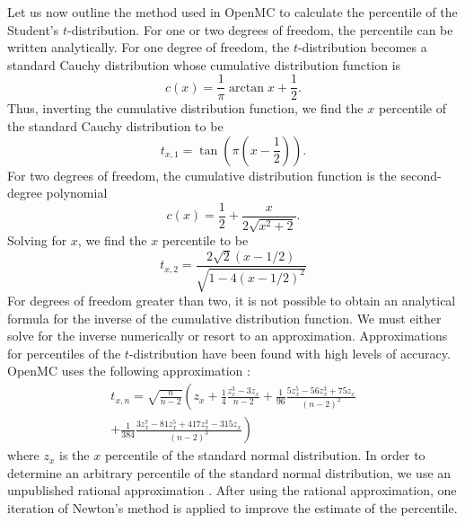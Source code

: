 Let us now outline the method used in OpenMC to calculate the percentile of the
Student's $t$-distribution. For one or two degrees of freedom, the percentile
can be written analytically. For one degree of freedom, the $t$-distribution
becomes a standard Cauchy distribution whose cumulative distribution function is
\begin{equation}
  \label{eq:cauchy-cdf}
  c(x) = \frac{1}{\pi} \arctan x + \frac{1}{2}. 
\end{equation}
Thus, inverting the cumulative distribution function, we find the $x$
percentile of the standard Cauchy distribution to be
\begin{equation}
  \label{eq:percentile-1}
  t_{x,1} = \tan \left ( \pi \left ( x - \frac{1}{2} \right ) \right ).
\end{equation}
For two degrees of freedom, the cumulative distribution function is the
second-degree polynomial
\begin{equation}
  \label{eq:t-2-polynomial}
  c(x) = \frac{1}{2} + \frac{x}{2\sqrt{x^2 + 2}}.
\end{equation}
Solving for $x$, we find the $x$ percentile to be
\begin{equation}
  \label{eq:percentile-2}
  t_{x,2} = \frac{2\sqrt{2} (x - 1/2)}{\sqrt{1 - 4 (x - 1/2)^2}}
\end{equation}
For degrees of freedom greater than two, it is not possible to obtain an
analytical formula for the inverse of the cumulative distribution function. We
must either solve for the inverse numerically or resort to an
approximation. Approximations for percentiles of the $t$-distribution have been
found with high levels of accuracy. OpenMC uses the following approximation
\cite{cis-george-1987}:
\begin{equation}
  \label{eq:percentile-n}
  \begin{split}
    t_{x,n} = \sqrt{\frac{n}{n-2}} \left( z_x + \frac{1}{4} \frac{z_x^3 -
      3z_x}{n-2} + \frac{1}{96} \frac{5z_x^5 - 56z_x^3 + 75z_x}{(n-2)^2}
    \right. \\ + \left. \frac{1}{384} \frac{3z_x^7 - 81z_x^5 + 417z_x^3 -
      315z_x}{(n-2)^3} \right)
  \end{split}
\end{equation}
where $z_x$ is the $x$ percentile of the standard normal distribution. In order
to determine an arbitrary percentile of the standard normal distribution, we use
an unpublished rational approximation \cite{acklam-2010}. After using the
rational approximation, one iteration of Newton's method is applied to improve
the estimate of the percentile.

